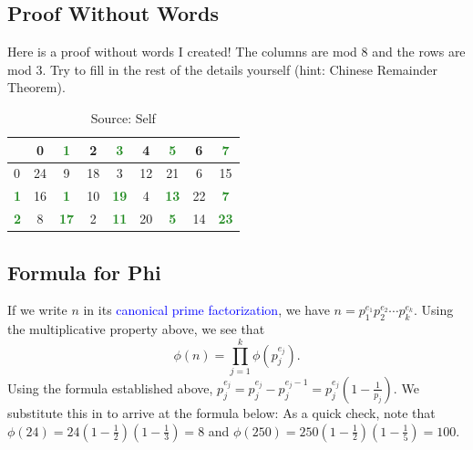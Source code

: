 \subsection{Proof Without Words}
Here is a proof without words I created! The columns are mod $8$ and the rows are mod $3$. Try to fill in the rest of the details yourself (hint: Chinese Remainder Theorem).
\begin{table}[h]
	\centering
	\begin{tabular}{l | c c c c c c c c|}
		\toprule
		& 0 & \textbf{\textcolor{ForestGreen}{1}} & 2 & \textbf{\textcolor{ForestGreen}{3}} & 4 & \textbf{\textcolor{ForestGreen}{5}} & 6 & \textbf{\textcolor{ForestGreen}{7}} \\
		\midrule
		0 & 24 & 9 & 18 & 3 & 12 & 21 & 6 & 15 \\
		\textbf{\textcolor{ForestGreen}{1}} & 16 & \textbf{\textcolor{ForestGreen}{1}} & 10 & \textbf{\textcolor{ForestGreen}{19}} & 4 & \textbf{\textcolor{ForestGreen}{13}} & 22 & \textbf{\textcolor{ForestGreen}{7}} \\
		\textbf{\textcolor{ForestGreen}{2}} & 8 & \textbf{\textcolor{ForestGreen}{17}} & 2 & \textbf{\textcolor{ForestGreen}{11}} & 20 & \textbf{\textcolor{ForestGreen}{5}} & 14 & \textbf{\textcolor{ForestGreen}{23}} \\

		\bottomrule
	\end{tabular}
	\caption{Source: Self}
\end{table}
\subsection{Formula for Phi}
If we write $n$ in its \textcolor{blue}{canonical prime factorization}, we have $n=\displaystyle p_1^{e_1}p_2^{e_2}\cdots p_k^{e_k}$. Using the multiplicative property above, we see that $$\phi(n)=\prod_{j=1}^{k}\phi\left(p_j^{e_j}\right).$$
Using the formula established above, $p_j^{e_j}=p_j^{e_j}-p_j^{e_j-1}=p_j^{e_j}\left(1-\frac{1}{p_j}\right)$. We substitute this in to arrive at the formula below:
\vspace{5pt}
As a quick check, note that $\phi(24)=24\left(1-\frac12\right)\left(1-\frac13\right)=8$ and $\phi(250)=250\left(1-\frac12\right)\left(1-\frac15\right)=100$. 

